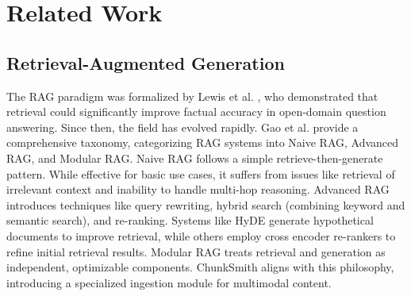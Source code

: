\documentclass[conference]{IEEEtran}
\begin{document}
\section{Related Work}
\subsection{Retrieval-Augmented Generation}
The RAG paradigm was formalized by Lewis et al. \cite{lewis2020retrieval}, who demonstrated that retrieval could significantly improve factual accuracy in open-domain question answering. Since then, the field has evolved rapidly. Gao et al. \cite{gao2023retrieval} provide a comprehensive taxonomy, categorizing RAG systems into Naive RAG, Advanced RAG, and Modular RAG. Naive RAG follows a simple retrieve-then-generate pattern. While effective for basic use cases, it suffers from issues like retrieval of irrelevant context and inability to handle multi-hop reasoning. Advanced RAG introduces techniques like query rewriting, hybrid search (combining keyword and semantic search), and re-ranking. Systems like HyDE \cite{gao2022precise} generate hypothetical documents to improve retrieval, while others employ cross encoder re-rankers to refine initial retrieval results. Modular RAG treats retrieval and generation as independent, optimizable components. ChunkSmith aligns with this philosophy, introducing a specialized ingestion module for multimodal content.
\end{document}
